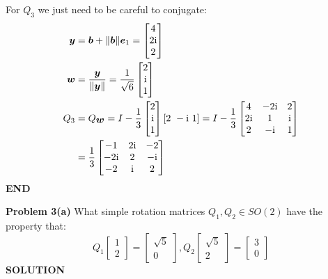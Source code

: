 \documentclass[12pt,a4paper]{article}
\def\b{ {\vc b} }
\def\e{ {\vc e} }
\def\y{ {\vc y} }
\def\w{ {\vc w} }
\begin{document}
For $Q_3$ we just need to be careful to conjugate:
\begin{align*}
\ensuremath{\bm{\y}} &= \ensuremath{\bm{\b}} + \| \ensuremath{\bm{\b}}\| \ensuremath{\bm{\e}}_1 =  \begin{bmatrix} 4 \\ 2{\rm i} \\ 2 \end{bmatrix} \\
\ensuremath{\bm{\w}} &= {\ensuremath{\bm{\y}} \over \|\ensuremath{\bm{\y}}\|} = {1 \over \sqrt{6}} \begin{bmatrix}2 \\ {\rm i} \\ 1 \end{bmatrix} \\
Q_3 &= Q_{\ensuremath{\bm{\w}}} = I - {1 \over 3} \begin{bmatrix} 2 \\ {\rm i} \\ 1 \end{bmatrix}  [2\ -{\rm i}\ 1] = 
I - {1 \over 3} \begin{bmatrix} 4 & -2{\rm i} & 2 \\ 
                                2{\rm i}& 1 & {\rm i} \\ 
                                2 &-{\rm i} & 1 \end{bmatrix} \\
&={1 \over 3} \begin{bmatrix} -1 & 2{\rm i} & -2 \\ 
                            -2{\rm i} & 2 & -{\rm i} \\ 
                            -2& {\rm i} & 2 \end{bmatrix} 
\end{align*}
\textbf{END}

\textbf{Problem 3(a)} What simple rotation matrices $Q_1,Q_2 \ensuremath{\in} SO(2)$ have the property that:
\[
Q_1 \begin{bmatrix} 1 \\ 2 \end{bmatrix} =\begin{bmatrix} \sqrt{5} \\ 0 \end{bmatrix},  Q_2 \begin{bmatrix} \sqrt{5} \\ 2 \end{bmatrix} =  \begin{bmatrix} 3 \\ 0 \end{bmatrix}
\]
\textbf{SOLUTION}
\end{document}
